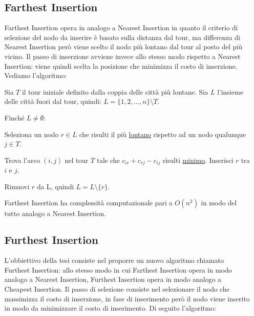 \documentclass[a4paper,12pt]{report}
\begin{document}
\subsection{Farthest Insertion}
Farthest Insertion opera in analogo a Nearest Insertion in quanto il criterio di selezione del nodo da inserire è basato sulla distanza dal tour, ma differenza di Nearest Insertion però viene scelto il nodo più lontano dal tour al posto del più vicino. Il passo di inserzione avviene invece allo stesso modo rispetto a Nearest Insertion: viene quindi scelta la posizione che minimizza il costo di inserzione. Vediamo l'algoritmo:

\begin{legal}
  \item Sia $T$ il tour iniziale definito dalla coppia delle città più lontane. Sia $L$ l'insieme delle città fuori dal tour, quindi: $L = \{1, 2, ..., n\} \setminus T$.
  \item Finché $L \neq \emptyset$:
  \begin{legal}
    \item Seleziona un nodo $r \in L$ che risulti il più \underline{lontano} rispetto ad un nodo qualunque $j \in T$.
    \item Trova l'arco $(i, j)$ nel tour $T$ tale che $c_{ir} + c_{rj} - c_{ij}$ risulti \underline{minimo}. Inserisci $r$ tra $i$ e $j$.  
    \item Rimuovi $r$ da L, quindi $L = L \setminus \{r\}$.
  \end{legal}
\end{legal}
\hfill \break Farthest Insertion ha complessità computazionale pari a $O(n^2)$ in modo del tutto analogo a Nearest Insertion.

\subsection{Furthest Insertion}
L'obbiettivo della tesi consiste nel proporre un nuovo algoritmo chiamato Furthest Insertion: allo stesso modo in cui Farthest Insertion opera in modo analogo a Nearest Insertion, Furthest Insertion opera in modo analogo a Cheapest Insertion. Il passo di selezione consiste nel selezionare il nodo che massimizza il costo di inserzione, in fase di inserimento però il nodo viene inserito in modo da minimizzare il costo di inserimento. Di seguito l'algoritmo:
\end{document}
